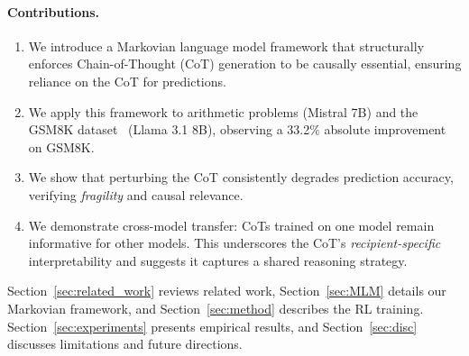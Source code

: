 \documentclass{article}
\begin{document}
\paragraph{Contributions.}
\begin{enumerate}
    \item We introduce a Markovian language model framework that structurally enforces Chain-of-Thought (CoT) generation to be causally essential, ensuring reliance on the CoT for predictions.
    \item We apply this framework to arithmetic problems (Mistral 7B) and the GSM8K dataset~\citep{cobbe2021gsm8k} (Llama 3.1 8B), observing a 33.2\% absolute improvement on GSM8K.
    \item We show that perturbing the CoT consistently degrades prediction accuracy, verifying \emph{fragility} and causal relevance.
    \item We demonstrate cross-model transfer: CoTs trained on one model remain informative for other models. This underscores the CoT's \emph{recipient-specific} interpretability and suggests it captures a shared reasoning strategy.
\end{enumerate}

Section~\ref{sec:related_work} reviews related work, Section~\ref{sec:MLM} details our Markovian framework, and Section~\ref{sec:method} describes the RL training. Section~\ref{sec:experiments} presents empirical results, and Section~\ref{sec:disc} discusses limitations and future directions.
\end{document}
